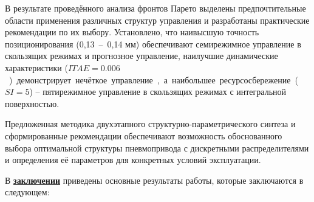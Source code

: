 В результате проведённого анализа фронтов Парето выделены предпочтительные
области применения различных структур управления и разработаны практические
рекомендации по их выбору. Установлено, что наивысшую точность позиционирования
(0,13~--~0,14 мм) обеспечивают семирежимное управление в скользящих режимах и прогнозное
управление, наилучшие динамические характеристики ($ITAE = \num{0,006}$ \si{\metre\per\second\square}) демонстрирует нечёткое управление, а наибольшее ресурсосбережение ($SI = 5$) -- пятирежимное управление в скользящих режимах с интегральной поверхностью.

Предложенная методика двухэтапного структурно-параметрического синтеза и сформированные
рекомендации обеспечивают возможность обоснованного выбора оптимальной
структуры пневмопривода с дискретными распределителями и определения её параметров для конкретных условий эксплуатации.


\FloatBarrier
{}                                  %
В \underline{\textbf{заключении}} приведены основные результаты работы, которые заключаются в следующем:


